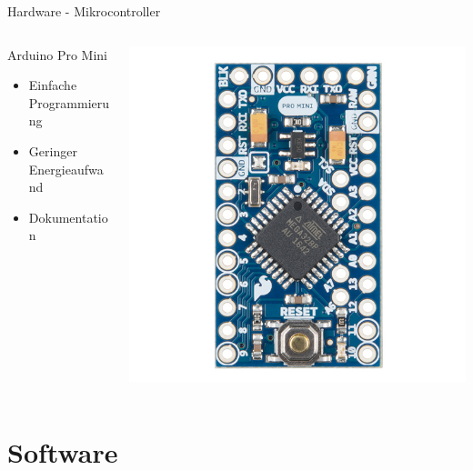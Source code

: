 \documentclass{beamer}
\begin{document}
\begin{frame}{Hardware - Mikrocontroller}

\begin{columns}[T] %
	\begin{column}{.48\textwidth}
		\begin{block}{Arduino Pro Mini}
			\begin{itemize}
				\item Einfache Programmierung
				\item Geringer Energieaufwand
				\item Dokumentation
			\end{itemize}
		\end{block}
	\end{column}%
	\hfill%
	\begin{column}{.48\textwidth}
		\includegraphics{arduino}
	\end{column}%
\end{columns}

\end{frame}

\section{Software}
\end{document}
